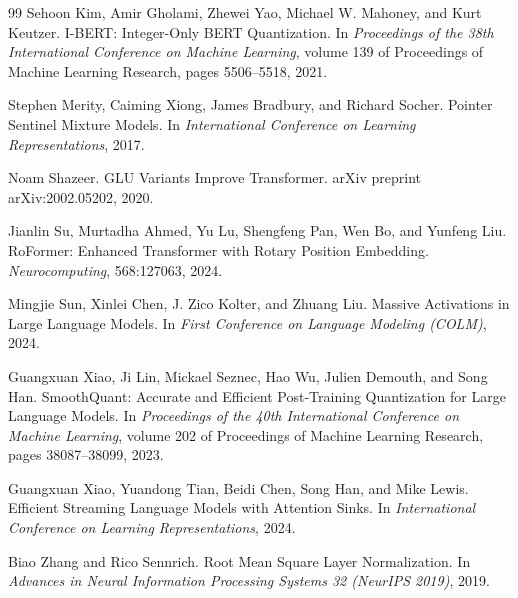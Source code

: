 \documentclass[11pt]{article}
\begin{document}
\begin{thebibliography}{99}
Sehoon Kim, Amir Gholami, Zhewei Yao, Michael W. Mahoney, and Kurt Keutzer.
I-BERT: Integer-Only BERT Quantization.
In \emph{Proceedings of the 38th International Conference on Machine Learning}, volume 139 of Proceedings of Machine Learning Research, pages 5506--5518, 2021.

Stephen Merity, Caiming Xiong, James Bradbury, and Richard Socher.
Pointer Sentinel Mixture Models.
In \emph{International Conference on Learning Representations}, 2017.

Noam Shazeer.
GLU Variants Improve Transformer.
arXiv preprint arXiv:2002.05202, 2020.

Jianlin Su, Murtadha Ahmed, Yu Lu, Shengfeng Pan, Wen Bo, and Yunfeng Liu.
RoFormer: Enhanced Transformer with Rotary Position Embedding.
\emph{Neurocomputing}, 568:127063, 2024.

Mingjie Sun, Xinlei Chen, J. Zico Kolter, and Zhuang Liu.
Massive Activations in Large Language Models.
In \emph{First Conference on Language Modeling (COLM)}, 2024.

Guangxuan Xiao, Ji Lin, Mickael Seznec, Hao Wu, Julien Demouth, and Song Han.
SmoothQuant: Accurate and Efficient Post-Training Quantization for Large Language Models.
In \emph{Proceedings of the 40th International Conference on Machine Learning}, volume 202 of Proceedings of Machine Learning Research, pages 38087--38099, 2023.

Guangxuan Xiao, Yuandong Tian, Beidi Chen, Song Han, and Mike Lewis.
Efficient Streaming Language Models with Attention Sinks.
In \emph{International Conference on Learning Representations}, 2024.

Biao Zhang and Rico Sennrich.
Root Mean Square Layer Normalization.
In \emph{Advances in Neural Information Processing Systems 32 (NeurIPS 2019)}, 2019.

\end{thebibliography}
\end{document}
